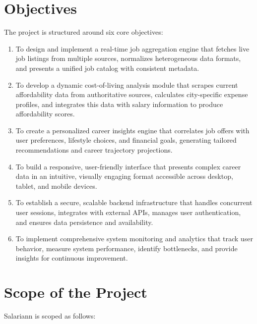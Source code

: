 \documentclass[12pt,a4paper,oneside]{report}
\begin{document}
\section{Objectives}

The project is structured around six core objectives:

\begin{enumerate}
    \item To design and implement a real-time job aggregation engine that fetches live job listings from multiple sources, normalizes heterogeneous data formats, and presents a unified job catalog with consistent metadata.
    
    \item To develop a dynamic cost-of-living analysis module that scrapes current affordability data from authoritative sources, calculates city-specific expense profiles, and integrates this data with salary information to produce affordability scores.
    
    \item To create a personalized career insights engine that correlates job offers with user preferences, lifestyle choices, and financial goals, generating tailored recommendations and career trajectory projections.
    
    \item To build a responsive, user-friendly interface that presents complex career data in an intuitive, visually engaging format accessible across desktop, tablet, and mobile devices.
    
    \item To establish a secure, scalable backend infrastructure that handles concurrent user sessions, integrates with external APIs, manages user authentication, and ensures data persistence and availability.
    
    \item To implement comprehensive system monitoring and analytics that track user behavior, measure system performance, identify bottlenecks, and provide insights for continuous improvement.
\end{enumerate}

\section{Scope of the Project}

Salariann is scoped as follows:
\end{document}
